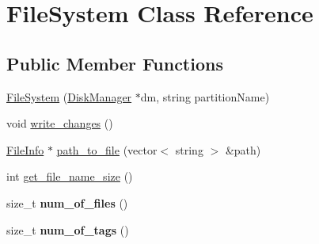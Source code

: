 \hypertarget{classFileSystem}{}\section{File\+System Class Reference}
\label{classFileSystem}
\subsection*{Public Member Functions}
\begin{DoxyCompactItemize}
\item 
\hyperlink{classFileSystem_a1466c6d1e9636cecd44f0dd68ef710b5}{File\+System} (\hyperlink{classDiskManager}{Disk\+Manager} $\ast$dm, string partition\+Name)
\item 
void \hyperlink{classFileSystem_a02953b33b71137de70b8c8e48c59ff77}{write\+\_\+changes} ()
\item 
\hyperlink{classFileInfo}{File\+Info} $\ast$ \hyperlink{classFileSystem_a6c6e95f60417b02601b72e951e7108f8}{path\+\_\+to\+\_\+file} (vector$<$ string $>$ \&path)
\item 
int \hyperlink{classFileSystem_a0444400c1e30b7981123ba6991798c86}{get\+\_\+file\+\_\+name\+\_\+size} ()
\item 
size\+\_\+t {\bfseries num\+\_\+of\+\_\+files} ()\hypertarget{classFileSystem_abed8c3903751d882a668a2ced7d0f144}{}\label{classFileSystem_abed8c3903751d882a668a2ced7d0f144}

\item 
size\+\_\+t {\bfseries num\+\_\+of\+\_\+tags} ()\hypertarget{classFileSystem_ad5aa3ef11ac131718e7a2b7abb07f6ec}{}\label{classFileSystem_ad5aa3ef11ac131718e7a2b7abb07f6ec}

\end{DoxyCompactItemize}
